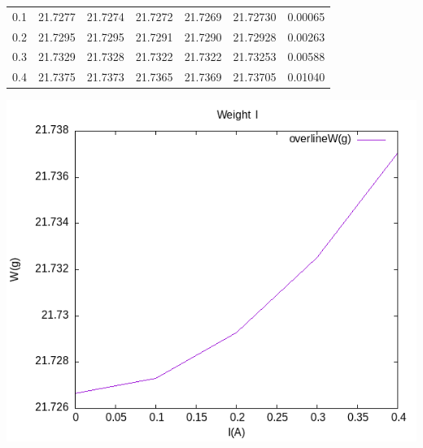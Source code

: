 \documentclass[11pt]{report}
\begin{document}
\begin{enumerate}
\begin{center}
\begin{tabular}{rrrrrrr}
0.1 & 21.7277 & 21.7274 & 21.7272 & 21.7269 & 21.72730 & 0.00065\\
0.2 & 21.7295 & 21.7295 & 21.7291 & 21.7290 & 21.72928 & 0.00263\\
0.3 & 21.7329 & 21.7328 & 21.7322 & 21.7322 & 21.73253 & 0.00588\\
0.4 & 21.7375 & 21.7373 & 21.7365 & 21.7369 & 21.73705 & 0.01040\\
\end{tabular}
\end{center}
\begin{center}
\includegraphics[width=.9\linewidth]{../img/2-3.png}
\end{center}
\end{enumerate}
\end{document}

